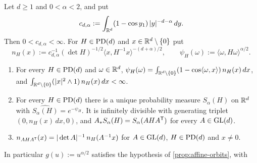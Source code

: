 \begin{lemma}
\label{lem:elliptical-stable}
\leanok
Let $d \ge 1$ and $0 < \alpha < 2$, and put
\[
  c_{d,\alpha} := \int_{\mathbb{R}^d}(1 - \cos y_1)\,|y|^{-d-\alpha}\,dy .
\]
Then $0 < c_{d,\alpha} < \infty$. For $H \in \mathrm{PD}(d)$ and $x \in \mathbb{R}^d \setminus \{0\}$ put
\begin{equation}\label{eq:stable-levy-density}
  n_H(x) := c_{d,\alpha}^{-1}(\det H)^{-1/2}\langle x,H^{-1}x\rangle^{-(d+\alpha)/2} ,
  \qquad \psi_H(\omega) := \langle\omega,H\omega\rangle^{\alpha/2} .
\end{equation}
\begin{enumerate}
\item For every $H \in \mathrm{PD}(d)$ and $\omega \in \mathbb{R}^d$,
$\psi_H(\omega) = \int_{\mathbb{R}^d\setminus\{0\}}(1 - \cos\langle\omega,x\rangle)\,n_H(x)\,dx$, and
$\int_{\mathbb{R}^d\setminus\{0\}}(|x|^2 \wedge 1)\,n_H(x)\,dx < \infty$.
\item For every $H \in \mathrm{PD}(d)$ there is a unique probability measure $S_\alpha(H)$ on $\mathbb{R}^d$ with
$\widehat{S_\alpha(H)} = e^{-\psi_H}$. It is infinitely divisible with generating triplet
$(0, n_H(x)\,dx, 0)$, and $A_*S_\alpha(H) = S_\alpha(AHA^{\mathsf{T}})$ for every $A \in \mathrm{GL}(d)$.
\item $n_{AHA^{\mathsf{T}}}(x) = |\det A|^{-1}\,n_H(A^{-1}x)$ for $A \in \mathrm{GL}(d)$, $H \in \mathrm{PD}(d)$ and
$x \ne 0$.
\end{enumerate}
In particular $g(u) := u^{\alpha/2}$ satisfies the hypothesis of \ref{prop:affine-orbits}, with

\end{lemma}
